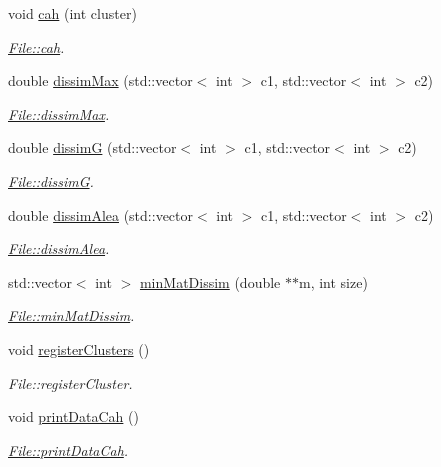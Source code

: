 \begin{DoxyCompactItemize}
\item 
void \hyperlink{classFile_a4714786d79812c9aa720403af5a43210}{cah} (int cluster)
\begin{DoxyCompactList}\small\item\em \hyperlink{classFile_a4714786d79812c9aa720403af5a43210}{File\+::cah}. \end{DoxyCompactList}\item 
double \hyperlink{classFile_aba34124d22699d7cb26bcbeb85bef0f8}{dissim\+Max} (std\+::vector$<$ int $>$ c1, std\+::vector$<$ int $>$ c2)
\begin{DoxyCompactList}\small\item\em \hyperlink{classFile_aba34124d22699d7cb26bcbeb85bef0f8}{File\+::dissim\+Max}. \end{DoxyCompactList}\item 
double \hyperlink{classFile_a0db1da2014c0f1ac9253efe86c0a57d8}{dissim\+G} (std\+::vector$<$ int $>$ c1, std\+::vector$<$ int $>$ c2)
\begin{DoxyCompactList}\small\item\em \hyperlink{classFile_a0db1da2014c0f1ac9253efe86c0a57d8}{File\+::dissim\+G}. \end{DoxyCompactList}\item 
double \hyperlink{classFile_a42bd0e57ed74e6243e47a0f8ce187bb8}{dissim\+Alea} (std\+::vector$<$ int $>$ c1, std\+::vector$<$ int $>$ c2)
\begin{DoxyCompactList}\small\item\em \hyperlink{classFile_a42bd0e57ed74e6243e47a0f8ce187bb8}{File\+::dissim\+Alea}. \end{DoxyCompactList}\item 
std\+::vector$<$ int $>$ \hyperlink{classFile_a2fb2437e094b917b7d5d9836a75e5d4f}{min\+Mat\+Dissim} (double $\ast$$\ast$m, int size)
\begin{DoxyCompactList}\small\item\em \hyperlink{classFile_a2fb2437e094b917b7d5d9836a75e5d4f}{File\+::min\+Mat\+Dissim}. \end{DoxyCompactList}\item 
void \hyperlink{classFile_a311c46b95241183e414757bb52f79f7a}{register\+Clusters} ()
\begin{DoxyCompactList}\small\item\em File\+::register\+Cluster. \end{DoxyCompactList}\item 
void \hyperlink{classFile_afc54ef20547ada0b2bc0c1f7a0a939f1}{print\+Data\+Cah} ()
\begin{DoxyCompactList}\small\item\em \hyperlink{classFile_afc54ef20547ada0b2bc0c1f7a0a939f1}{File\+::print\+Data\+Cah}. \end{DoxyCompactList}\end{DoxyCompactItemize}
